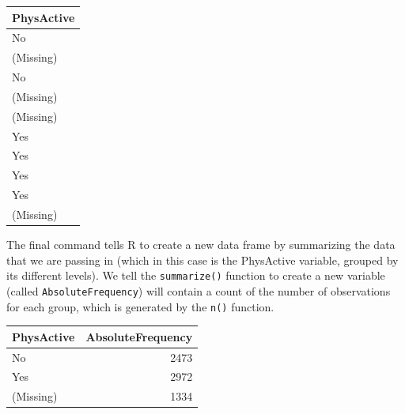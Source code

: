\documentclass[12pt,]{book}
\newenvironment{Shaded}{\begin{snugshade}}{\end{snugshade}}
\newcommand{\CommentTok}[1]{\textcolor[rgb]{0.56,0.35,0.01}{\textit{#1}}}
\newcommand{\DataTypeTok}[1]{\textcolor[rgb]{0.13,0.29,0.53}{#1}}
\newcommand{\KeywordTok}[1]{\textcolor[rgb]{0.13,0.29,0.53}{\textbf{#1}}}
\newcommand{\NormalTok}[1]{#1}
\newcommand{\OperatorTok}[1]{\textcolor[rgb]{0.81,0.36,0.00}{\textbf{#1}}}
\newcommand{\StringTok}[1]{\textcolor[rgb]{0.31,0.60,0.02}{#1}}
\begin{document}
\begin{tabular}{l}
\hline
PhysActive\\
\hline
No\\
\hline
(Missing)\\
\hline
No\\
\hline
(Missing)\\
\hline
(Missing)\\
\hline
Yes\\
\hline
Yes\\
\hline
Yes\\
\hline
Yes\\
\hline
(Missing)\\
\hline
\end{tabular}

The final command tells R to create a new data frame by summarizing the data that we are passing in (which in this case is the PhysActive variable, grouped by its different levels). We tell the \texttt{summarize()} function to create a new variable (called \texttt{AbsoluteFrequency}) will contain a count of the number of observations for each group, which is generated by the \texttt{n()} function.

\begin{Shaded}
\end{Shaded}

\begin{tabular}{l|r}
\hline
PhysActive & AbsoluteFrequency\\
\hline
No & 2473\\
\hline
Yes & 2972\\
\hline
(Missing) & 1334\\
\hline
\end{tabular}
\end{document}
